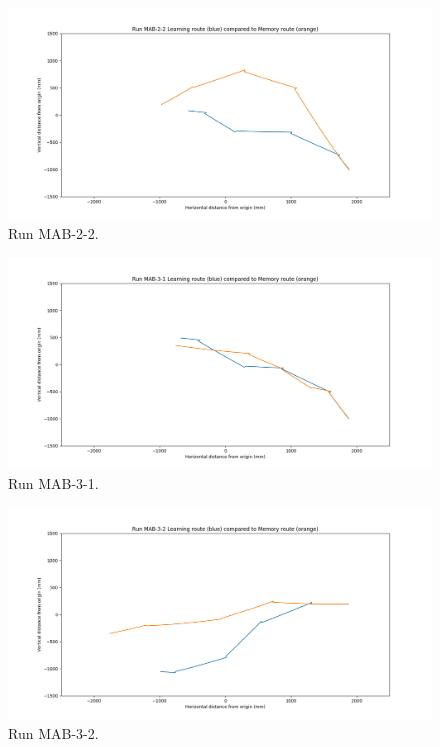 \documentclass[a4paper,12pt,twoside,openright]{article}
\begin{document}
\begin{figure}[h!]
 \centering
  \includegraphics[width=\textwidth]{MAB-2-2}
  \caption{
    \label{fig:mab-2-2} Run MAB-2-2.
  }
\end{figure}

\begin{figure}[h!]
 \centering
  \includegraphics[width=\textwidth]{MAB-3-1}
  \caption{
    \label{fig:mab-3-1} Run MAB-3-1.
  }
\end{figure}

\begin{figure}[h!]
 \centering
  \includegraphics[width=\textwidth]{MAB-3-2}
  \caption{
    \label{fig:mab-3-2} Run MAB-3-2.
  }
\end{figure}
\end{document}
